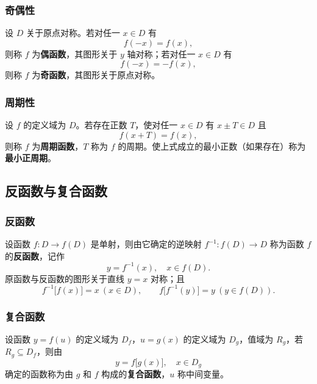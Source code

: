 \subsubsection{奇偶性}
设 $D$ 关于原点对称。若对任一 $x\in D$ 有
\[
f(-x)=f(x),
\]
则称 $f$ 为\textbf{偶函数}，其图形关于 $y$ 轴对称；若对任一 $x\in D$ 有
\[
f(-x)=-f(x),
\]
则称 $f$ 为\textbf{奇函数}，其图形关于原点对称。


\subsubsection{周期性}
设 $f$ 的定义域为 $D$。若存在正数 $T$，使对任一 $x\in D$ 有 $x\pm T\in D$ 且
\[
f(x+T)=f(x),
\]
则称 $f$ 为\textbf{周期函数}，$T$ 称为 $f$ 的周期。使上式成立的最小正数（如果存在）称为\textbf{最小正周期}。


\subsection{反函数与复合函数}\label{sec:fanhanshu}

\subsubsection{反函数}
设函数 $f:D\to f(D)$ 是单射，则由它确定的逆映射 $f^{-1}:f(D)\to D$ 称为函数 $f$ 的\textbf{反函数}，记作
\[
y=f^{-1}(x),\quad x\in f(D).
\]
原函数与反函数的图形关于直线 $y=x$ 对称；且
\[
f^{-1}\bigl[f(x)\bigr]=x\ (x\in D),\qquad f\bigl[f^{-1}(y)\bigr]=y\ (y\in f(D)).
\]


\subsubsection{复合函数}
设函数 $y=f(u)$ 的定义域为 $D_f$，$u=g(x)$ 的定义域为 $D_g$，值域为 $R_g$，若 $R_g\subseteq D_f$，则由
\[
y=f\bigl[g(x)\bigr],\quad x\in D_g
\]
确定的函数称为由 $g$ 和 $f$ 构成的\textbf{复合函数}，$u$ 称中间变量。

